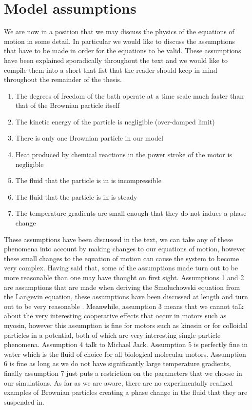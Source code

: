 \section{Model assumptions}
We are now in a position that we may discuss the physics of the equations of motion in some detail. In particular we would like to discuss the assumptions that have to be made in order for the equations to be valid. These assumptions have been explained sporadically throughout the text and we would like to compile them into a short that list that the reader should keep in mind throughout the remainder of the thesis.
\begin{enumerate}
\item{The degrees of freedom of the bath operate at a time scale much faster than that of the Brownian particle itself}
\item{The kinetic energy of the particle is negligible (over-damped limit)}
\item{There is only one Brownian particle in our model}
\item{Heat produced by chemical reactions in the power stroke of the motor is negligible}
\item{The fluid that the particle is in is incompressible}
\item{The fluid that the particle is in is steady}
\item{The temperature gradients are small enough that they do not induce a phase change}
\end{enumerate}
These assumptions have been discussed in the text, we can take any of these phenomena into account by making changes to our equations of motion, however these small changes to the equation of motion can cause the system to become very complex. Having said that, some of the assumptions made turn out to be more reasonable than one may have thought on first sight. Assumptions 1 and 2 are assumptions that are made when deriving the Smoluchowski equation from the Langevin equation, these assumptions have been discussed at length and turn out to be very reasonable \cite{Reimann2001,Gardiner2009,Einstein1905,KellerBustamante2000,Kramers1940}. Meanwhile, assumption 3 means that we cannot talk about the very interesting cooperative effects that occur in motors such as myosin, however this assumption is fine for motors such as kinesin or for colloidal particles in a potential, both of which are very interesting single particle phenomena. Assumption 4 {\color{red} talk to Michael Jack}. Assumption 5 is perfectly fine in water which is the fluid of choice for all biological molecular motors. Assumption 6 is fine as long as we do not have significantly large temperature gradients, finally assumption 7 just puts a restriction on the parameters that we choose in our simulations. As far as we are aware, there are no experimentally realized examples of Brownian particles creating a phase change in the fluid that they are suspended in.






